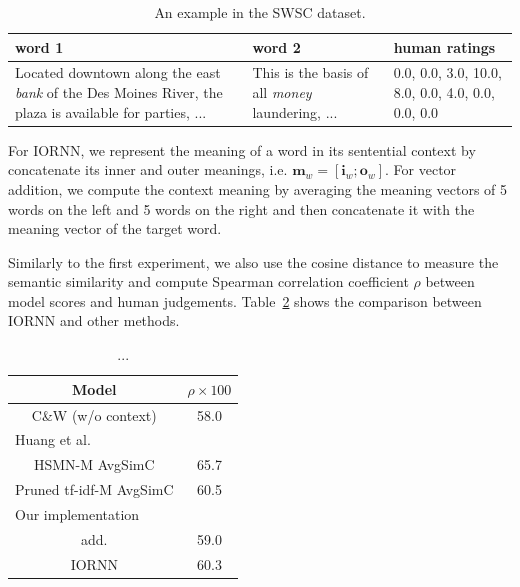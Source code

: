 \documentclass[11pt]{article}
\begin{document}
\begin{table}[!ht]
	\center
	\begin{tabular}{|p{6cm}|p{6cm}|p{3cm}|}
		\hline
		word 1 & word 2 & human ratings \\ \hline \hline
		
		 Located downtown along the east \textit{bank} of the Des Moines River, the plaza is available for parties, ... & This is the basis of all \textit{ money} laundering, ... &  0.0, 0.0, 3.0, 10.0, 8.0, 0.0, 4.0, 0.0, 0.0, 0.0 \\ \hline
	\end{tabular}
	\caption{An example in the SWSC dataset.}
	\label{table swsc}
\end{table}

For IORNN, we represent the meaning of a word in its sentential context by concatenate its inner 
and outer meanings, i.e. $\mathbf{m}_w = [\mathbf{i}_w;\mathbf{o}_w]$. 
For vector addition, we compute the context meaning by averaging the meaning vectors of 5 words
on the left and 5 words on the right and then concatenate it with the meaning vector of the target 
word.

Similarly to the 
first experiment, we also use the cosine distance to measure the semantic similarity
and compute Spearman correlation coefficient $\rho$ between model scores and human judgements.
Table~\ref{table swsc result} shows the comparison between IORNN and other methods.

\begin{table}[!ht]
	\center
	\begin{tabular}{cc}
		\hline
		Model & $\rho \times 100$ \\ \hline \hline

		C\&W (w/o context) & 58.0 \\ \hline
		
		\multicolumn{2}{l}{Huang et al.} \\
		HSMN-M AvgSimC & 65.7 \\ 
		Pruned tf-idf-M AvgSimC & 60.5 \\ \hline 
		
		\multicolumn{2}{l}{Our implementation} \\
		add. & 59.0 \\
		IORNN & 60.3 \\ \hline
		
	\end{tabular}
	\caption{...}
	\label{table swsc result}
\end{table}
 
\end{document}

